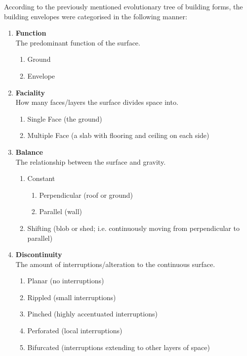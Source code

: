 According to the previously mentioned evolutionary tree of building forms, the building envelopes were categorised in the following manner:

\setlength{\columnseprule}{1pt}
\begin{multicols}{2}
\begin{enumerate}
	\item \textbf{Function}\\
		The predominant function of the surface.
		\begin{enumerate}
		\item Ground
		\item Envelope
		\end{enumerate}
	\item \textbf{Faciality}\\
		How many faces/layers the surface divides space into.	
		\begin{enumerate}
			\item Single Face (the ground)
			\item Multiple Face (a slab with flooring and ceiling on each side)
		\end{enumerate}
	\item \textbf{Balance}\\
		The relationship between the surface and gravity.
		\begin{enumerate}
			\item Constant
				\begin{enumerate}
					\item Perpendicular (roof or ground)
					\item Parallel (wall)
				\end{enumerate}
			\item Shifting (blob or shed; i.e. continuously moving from perpendicular to parallel)
		\end{enumerate}
	\item \textbf{Discontinuity}\\
		The amount of interruptions/alteration to the continuous surface.
		\begin{enumerate}
			\item Planar (no interruptions)
			\item Rippled (small interruptions)
			\item Pinched (highly accentuated interruptions)
			\item Perforated (local interruptions)
			\item Bifurcated (interruptions extending to other layers of space)
		\end{enumerate}

\end{enumerate}
\end{multicols}

